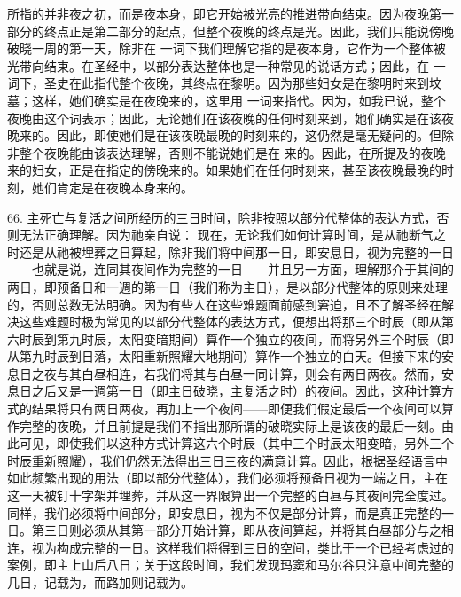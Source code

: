 所指的并非夜之初，而是夜本身，即它开始被光亮的推进带向结束。因为夜晚第一部分的终点正是第二部分的起点，但整个夜晚的终点是光。因此，我们只能说傍晚破晓一周的第一天，除非在  一词下我们理解它指的是夜本身，它作为一个整体被光带向结束。在圣经中，以部分表达整体也是一种常见的说话方式；因此，在  一词下，圣史在此指代整个夜晚，其终点在黎明。因为那些妇女是在黎明时来到坟墓；这样，她们确实是在夜晚来的，这里用  一词来指代。因为，如我已说，整个夜晚由这个词表示；因此，无论她们在该夜晚的任何时刻来到，她们确实是在该夜晚来的。因此，即使她们是在该夜晚最晚的时刻来的，这仍然是毫无疑问的。但除非整个夜晚能由该表达理解，否则不能说她们是在  来的。因此，在所提及的夜晚来的妇女，正是在指定的傍晚来的。如果她们在任何时刻来，甚至该夜晚最晚的时刻，她们肯定是在夜晚本身来的。\par

66. 主死亡与复活之间所经历的三日时间，除非按照以部分代整体的表达方式，否则无法正确理解。因为祂亲自说： 现在，无论我们如何计算时间，是从祂断气之时还是从祂被埋葬之日算起，除非我们将中间那一日，即安息日，视为完整的一日——也就是说，连同其夜间作为完整的一日——并且另一方面，理解那介于其间的两日，即预备日和一週的第一日（我们称为主日），是以部分代整体的原则来处理的，否则总数无法明确。因为有些人在这些难题面前感到窘迫，且不了解圣经在解决这些难题时极为常见的以部分代整体的表达方式，便想出将那三个时辰（即从第六时辰到第九时辰，太阳变暗期间）算作一个独立的夜间，而将另外三个时辰（即从第九时辰到日落，太阳重新照耀大地期间）算作一个独立的白天。但接下来的安息日之夜与其白昼相连，若我们将其与白昼一同计算，则会有两日两夜。然而，安息日之后又是一週第一日（即主日破晓，主复活之时）的夜间。因此，这种计算方式的结果将只有两日两夜，再加上一个夜间——即便我们假定最后一个夜间可以算作完整的夜晚，并且前提是我们不指出那所谓的破晓实际上是该夜的最后一刻。由此可见，即使我们以这种方式计算这六个时辰（其中三个时辰太阳变暗，另外三个时辰重新照耀），我们仍然无法得出三日三夜的满意计算。因此，根据圣经语言中如此频繁出现的用法（即以部分代整体），我们必须将预备日视为一端之日，主在这一天被钉十字架并埋葬，并从这一界限算出一个完整的白昼与其夜间完全度过。同样，我们必须将中间部分，即安息日，视为不仅是部分计算，而是真正完整的一日。第三日则必须从其第一部分开始计算，即从夜间算起，并将其白昼部分与之相连，视为构成完整的一日。这样我们将得到三日的空间，类比于一个已经考虑过的案例，即主上山后八日；关于这段时间，我们发现玛窦和马尔谷只注意中间完整的几日，记载为，而路加则记载为。\par

